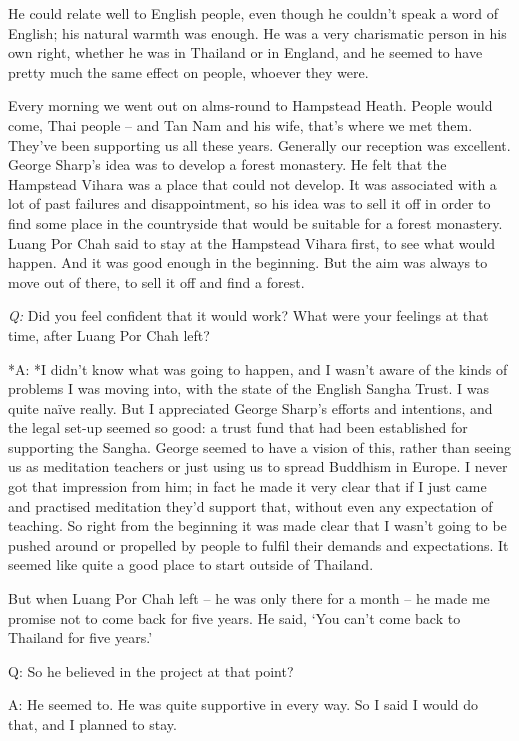 He could relate well to English people, even though he couldn't speak a
word of English; his natural warmth was enough. He was a very
charismatic person in his own right, whether he was in Thailand or in
England, and he seemed to have pretty much the same effect on people,
whoever they were.

Every morning we went out on alms-round to Hampstead Heath. People would
come, Thai people -- and Tan Nam and his wife, that's where we met them.
They've been supporting us all these years. Generally our reception was
excellent. George Sharp's idea was to develop a forest monastery. He
felt that the Hampstead Vihara was a place that could not develop. It
was associated with a lot of past failures and disappointment, so his
idea was to sell it off in order to find some place in the countryside
that would be suitable for a forest monastery. Luang Por Chah said to
stay at the Hampstead Vihara first, to see what would happen. And it was
good enough in the beginning. But the aim was always to move out of
there, to sell it off and find a forest.

\emph{Q:} Did you feel confident that it would work? What were your
feelings at that time, after Luang Por Chah left?

*A: *I didn't know what was going to happen, and I wasn't aware of the
kinds of problems I was moving into, with the state of the English
Sangha Trust. I was quite naïve really. But I appreciated George Sharp's
efforts and intentions, and the legal set-up seemed so good: a trust
fund that had been established for supporting the Sangha. George seemed
to have a vision of this, rather than seeing us as meditation teachers
or just using us to spread Buddhism in Europe. I never got that
impression from him; in fact he made it very clear that if I just came
and practised meditation they'd support that, without even any
expectation of teaching. So right from the beginning it was made clear
that I wasn't going to be pushed around or propelled by people to fulfil
their demands and expectations. It seemed like quite a good place to
start outside of Thailand.

But when Luang Por Chah left -- he was only there for a month -- he made
me promise not to come back for five years. He said, `You can't come
back to Thailand for five years.'

Q: So he believed in the project at that point?

A: He seemed to. He was quite supportive in every way. So I said I would
do that, and I planned to stay.

